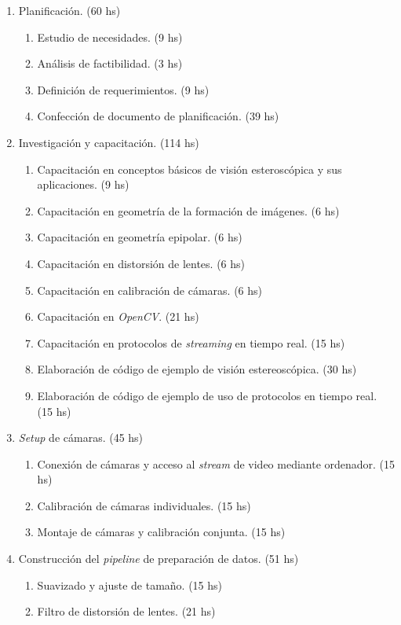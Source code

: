 \documentclass[
11pt, %
]{charter}
\begin{document}
\begin{enumerate}
\item Planificación. (60 hs)
	\begin{enumerate}
		\item Estudio de necesidades. (9 hs)
		\item Análisis de factibilidad. (3 hs)
		\item Definición de requerimientos. (9 hs)
		\item Confección de documento de planificación. (39 hs)
	\end{enumerate}
\item Investigación y capacitación. (114 hs)
	\begin{enumerate}
		\item Capacitación en conceptos básicos de visión esteroscópica y sus aplicaciones. (9 hs)
		\item Capacitación en geometría de la formación de imágenes. (6 hs)
		\item Capacitación en geometría epipolar. (6 hs)
		\item Capacitación en distorsión de lentes. (6 hs)
		\item Capacitación en calibración de cámaras. (6 hs)
		\item Capacitación en \emph{OpenCV}. (21 hs)
		\item Capacitación en protocolos de \emph{streaming} en tiempo real. (15 hs)
		\item Elaboración de código de ejemplo de visión estereoscópica. (30 hs)
		\item Elaboración de código de ejemplo de uso de protocolos en tiempo real. (15 hs)
	\end{enumerate}
\item \emph{Setup} de cámaras. (45 hs)
	\begin{enumerate}
		\item Conexión de cámaras y acceso al \emph{stream} de video mediante ordenador. (15 hs)
		\item Calibración de cámaras individuales. (15 hs)
		\item Montaje de cámaras y calibración conjunta. (15 hs)
	\end{enumerate}
\item Construcción del \emph{pipeline} de preparación de datos. (51 hs)
	\begin{enumerate}
		\item Suavizado y ajuste de tamaño. (15 hs)
		\item Filtro de distorsión de lentes. (21 hs)

\end{enumerate}
\end{enumerate}
\end{document}
